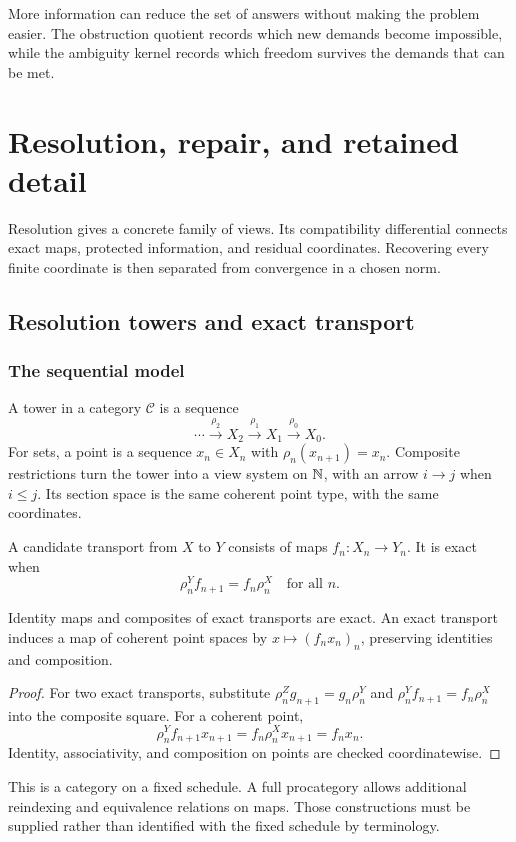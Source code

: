 \begin{insight}
More information can reduce the set of answers without making the problem easier. The obstruction quotient records which new demands become impossible, while the ambiguity kernel records which freedom survives the demands that can be met.
\end{insight}




\chapter{Resolution, repair, and retained detail}\label{KS:book:chapter-20}
Resolution gives a concrete family of views. Its compatibility differential connects exact maps, protected information, and residual coordinates. Recovering every finite coordinate is then separated from convergence in a chosen norm.

\section{Resolution towers and exact transport}\label{KS:sec:towers}
\subsection{The sequential model}
A tower in a category \(\mathcal C\) is a sequence
\[
 \cdots\xrightarrow{\rho_2}X_2\xrightarrow{\rho_1}X_1
 \xrightarrow{\rho_0}X_0.
\]
For sets, a point is a sequence \(x_n\in X_n\) with \(\rho_n(x_{n+1})=x_n\). Composite restrictions turn the tower into a view system on \(\mathbb N\), with an arrow \(i\to j\) when \(i\le j\). Its section space is the same coherent point type, with the same coordinates.

A candidate transport from \(X\) to \(Y\) consists of maps \(f_n:X_n\to Y_n\). It is exact when
\begin{equation}\label{KS:eq:exacttower}
 \rho^Y_n f_{n+1}=f_n\rho^X_n\quad\text{for all }n.
\end{equation}

\begin{KSproposition}\label{KS:KS16}
Identity maps and composites of exact transports are exact. An exact transport induces a map of coherent point spaces by \(x\mapsto(f_nx_n)_n\), preserving identities and composition.
\end{KSproposition}
\begin{proof}
For two exact transports, substitute \(\rho^Z_ng_{n+1}=g_n\rho^Y_n\) and \(\rho^Y_nf_{n+1}=f_n\rho^X_n\) into the composite square. For a coherent point,
\[
 \rho^Y_n f_{n+1}x_{n+1}
 =f_n\rho^X_nx_{n+1}=f_nx_n.
\]
Identity, associativity, and composition on points are checked coordinatewise.
\end{proof}
This is a category on a fixed schedule. A full procategory allows additional reindexing and equivalence relations on maps. Those constructions must be supplied rather than identified with the fixed schedule by terminology.

